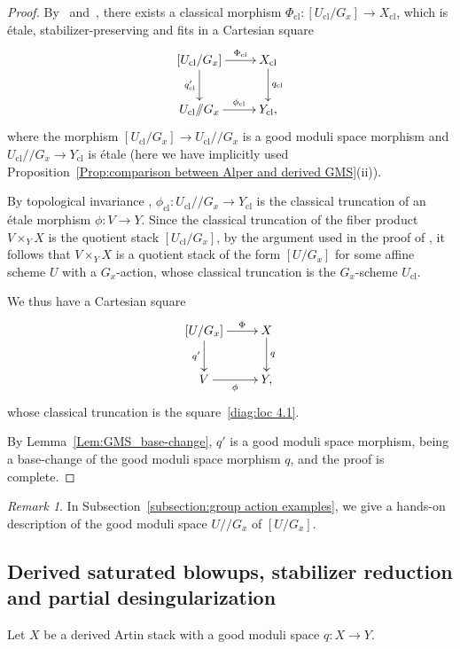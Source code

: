 \documentclass[a4paper,twoside,11pt]{amsart}
\theoremstyle{plain}
\theoremstyle{definition}
\theoremstyle{remark}
\newtheorem{remark}[theorem]{Remark}
\numberwithin{equation}{section}
\newcommand{\cl}{\mathrm{cl}} %
\def\git{/\!\!/}
\begin{document}
\begin{proof}
    By~\cite[Theorem~4.12]{AlperLuna} and~\cite[Theorem~6.1]{AHR2}, there exists a classical morphism $\Phi_\cl \colon [U_\cl / G_x] \to X_\cl$, which is \'{e}tale, stabilizer-preserving and fits in a Cartesian square 
    \begin{align} \label{diag:loc 4.1}
        \xymatrix{
        [U_\cl / G_x] \ar[d]_-{q'_\cl} \ar[r]^-{\Phi_\cl} & X_\cl \ar[d]^-{q_\cl} \\
        U_\cl \git G_x \ar[r]^-{\phi_\cl} & Y_\cl,
        }
    \end{align}
    where the morphism $[U_\cl/G_x] \to U_\cl \git G_x$ is a good moduli space morphism and $U_\cl \git G_x \to Y_\cl$ is \'{e}tale (here we have implicitly used Proposition~\ref{Prop:comparison between Alper and derived GMS}(ii)).

    By topological invariance \cite[Lemma~4.11]{HRS}, $\phi_\cl \colon U_\cl \git G_x \to Y_\cl$ is the classical truncation of an \'{e}tale morphism $\phi \colon V \to Y$. Since the classical truncation of the fiber product $V \times_Y X$ is the quotient stack $[U_\cl / G_x]$, by the argument used in the proof of \cite[Proposition~4.13]{HRS}, it follows that $V \times_Y X$ is a quotient stack of the form $[U / G_x]$ for some affine scheme $U$ with a $G_x$-action, whose classical truncation is the $G_x$-scheme $U_\cl$.

   We thus have a Cartesian square 
    \begin{align*}
        \xymatrix{
        [U / G_x] \ar[d]_-{q'} \ar[r]^-{\Phi} & X \ar[d]^-{q} \\
        V \ar[r]_-{\phi} & Y,
        }
    \end{align*}
    whose classical truncation is the square~\eqref{diag:loc 4.1}.

    By Lemma~\ref{Lem:GMS_base-change}, $q'$ is a good moduli space morphism, being a base-change of the good moduli space morphism $q$, and the proof is complete.    
\end{proof}

\begin{remark}
    In Subsection~\ref{subsection:group action examples}, we give a hands-on description of the good moduli space $U \git G_x$ of $[U/G_x]$.
\end{remark}

\subsection{Derived saturated blowups, stabilizer reduction and partial desingularization} Let $X$ be a derived Artin stack with a good moduli space $q \colon X \to Y$.
\end{document}
